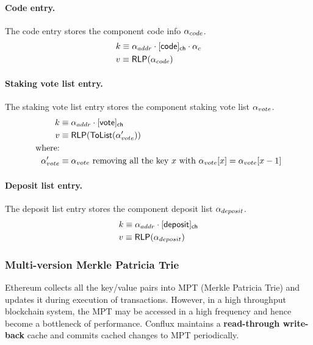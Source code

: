 \paragraph{Code entry.} The code entry stores the component code info $\mathbf{\alpha}_{code}$. 
\begin{align}
	&k\equiv \alpha_{addr}\cdot [{\sf code}]_{\sf ch}\cdot \alpha_c  \\
	&v\equiv \mathsf{RLP}(\mathbf{\alpha}_{code})
\end{align}

\paragraph{Staking vote list entry.} The staking vote list entry stores the component staking vote list $\mathbf{\alpha}_{vote}$. 
\begin{align}
	k&\equiv \alpha_{addr}\cdot [{\sf vote}]_{\sf ch}  \\
	v&\equiv \mathsf{RLP}(\mathsf{ToList}(\mathbf{\alpha}'_{vote}))\\
	\mbox{where:}&\notag\\ 
	\mathbf{\alpha}'_{vote} &\equiv \mbox{$\mathbf{\alpha}_{vote}$ removing all the key $x$ with $\mathbf{\alpha}_{vote}[x]=\mathbf{\alpha}_{vote}[x-1]$}
\end{align}

\paragraph{Deposit list entry.} The deposit list entry stores the component deposit list $\mathbf{\alpha}_{deposit}$. 
\begin{align}
	&k\equiv \alpha_{addr}\cdot [{\sf deposit}]_{\sf ch}  \\
	&v\equiv \mathsf{RLP}(\mathbf{\alpha}_{deposit})
\end{align}

\subsubsection{Multi-version Merkle Patricia Trie}

Ethereum collects all the key/value pairs into MPT (Merkle Patricia Trie) and updates it during execution of transactions. However, in a high throughput blockchain system, the MPT may be accessed in a high frequency and hence become a bottleneck of performance. Conflux maintains a \textbf{read-through write-back} cache and commits cached changes to MPT periodically. 

